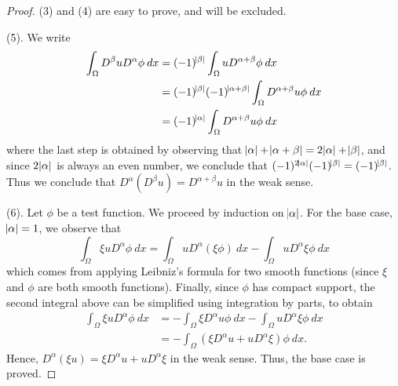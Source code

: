 \documentclass[10pt]{article}
\begin{document}
\begin{proof}
	(3) and (4) are easy to prove, and will be excluded.
	
	(5). We write 
	\begin{align*}
		\displaystyle \int_{\Omega}{D^\beta u D^\alpha \phi \: dx} &= (-1)^{\abs{\beta}}\int_{\Omega}{u D^{\alpha + \beta} \phi \: dx} \\
		&= (-1)^{\abs{\beta}}(-1)^{\abs{\alpha + \beta}}\int_{\Omega}{D^{\alpha + \beta}u \phi \: dx} \\
		&= (-1)^{\abs{\alpha}}\int_{\Omega}{D^{\alpha + \beta}u \phi \: dx}
	\end{align*}
	where the last step is obtained by observing that $\abs{\alpha} + \abs{\alpha + \beta} = 2\abs{\alpha} + \abs{\beta}$, and since $2\abs{\alpha}$ is always an even number, we conclude that $(-1)^{2\abs{\alpha}}(-1)^{\abs{\beta}} = (-1)^{\abs{\beta}}$. Thus we conclude that $D^\alpha(D^\beta u) = D^{\alpha + \beta}u$ in the weak sense. 
	
	(6). Let $\phi$ be a test function. We proceed by induction on $\abs{\alpha}$. For the base case, $\abs{\alpha} = 1$, we observe that 
	\begin{equation*}
		\displaystyle \int_{\Omega}{\xi u D^\alpha \phi \: dx} = \int_{\Omega}{uD^\alpha (\xi \phi) \: dx} - \int_{\Omega}{uD^\alpha \xi \phi \: dx} 
	\end{equation*}  
	which comes from applying Leibniz's formula for two smooth functions (since $\xi$ and $\phi$ are both smooth functions). Finally, since $\phi$ has compact support, the second integral above can be simplified using integration by parts, to obtain
	\begin{align*}
		\displaystyle \int_{\Omega}{\xi u D^\alpha \phi \: dx} &= -\int_{\Omega}{\xi D^\alpha u \phi \: dx} - \int_{\Omega}{uD^\alpha \xi \phi \: dx} \\
		&= -\int_{\Omega}{(\xi D^\alpha u + u D^\alpha \xi )\phi \: dx}.
	\end{align*}
	Hence, $D^\alpha(\xi u) = \xi D^\alpha u + u D^\alpha \xi$ in the weak sense. Thus, the base case is proved. 
		

\end{proof}
\end{document}
